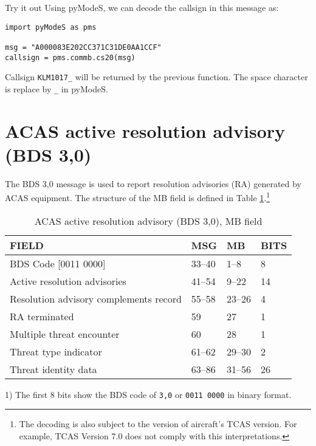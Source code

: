 \begin{notebox}{Try it out}
Using pyModeS, we can decode the callsign in this message as: 

\begin{verbatim}
import pyModeS as pms

msg = "A000083E202CC371C31DE0AA1CCF"
callsign = pms.commb.cs20(msg)
\end{verbatim}

Callsign \texttt{KLM1017\_} will be returned by the previous function. The space character is replace by \texttt{\_} in pyModeS.
\end{notebox}


\clearpage

\section{ACAS active resolution advisory (BDS 3,0)}

The BDS 3,0 message is used to report resolution advisories (RA) generated by ACAS equipment. The structure of the MB field is defined in Table \ref{tb:bds20}.\footnote{The decoding is also subject to the version of aircraft's TCAS version. For example, TCAS Version 7.0 does not comply with this interpretations.}

\begin{table}[ht]
\centering
\caption{ACAS active resolution advisory (BDS 3,0), MB field}
\label{tb:bds20}
\begin{tabular}{|l|l|l|l|}
\hline
\textbf{FIELD} & \textbf{MSG} & \textbf{MB} & \textbf{BITS} \\ \hline
BDS Code {[}0011 0000{]} & 33--40 & 1--8 & 8 \\ \hline
Active resolution advisories & 41--54 & 9--22 & 14 \\ \hline
Resolution advisory complements record & 55--58 & 23--26 & 4 \\ \hline
RA terminated & 59 & 27 & 1 \\ \hline
Multiple threat encounter & 60 & 28 & 1 \\ \hline
Threat type indicator & 61--62 & 29--30 & 2 \\ \hline
Threat identity data & 63--86 & 31--56 & 26 \\ \hline
\end{tabular}
\end{table}


1) The first 8 bits show the BDS code of \texttt{3,0} or \texttt{0011 0000} in binary format.

